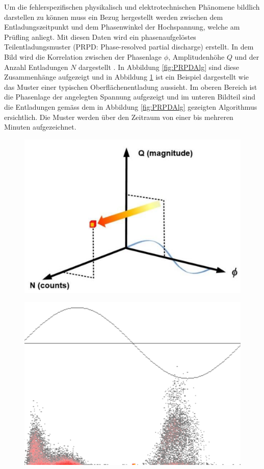 \begin{refsection}
Um die fehlerspezifischen physikalisch und elektrotechnischen Phänomene bildlich darstellen zu können muss ein Bezug hergestellt werden zwischen dem Entladungszeitpunkt und dem Phasenwinkel der Hochspannung, welche am Prüfling anliegt. 
Mit diesen Daten wird ein phasenaufgelöstes Teilentladungsmuster (PRPD: Phase-resolved partial discharge) erstellt. 
In dem Bild wird die Korrelation zwischen der Phasenlage $\phi$, Amplitudenhöhe $Q$ und der Anzahl Entladungen $N$ dargestellt \cite{buch:UHFSignale}. 
In Abbildung \ref{fig:PRPDAlg} sind diese Zusammenhänge aufgezeigt und in Abbildung \ref{fig:PRPDHohl} 
ist ein Beispiel dargestellt wie das Muster einer typischen Oberflächenentladung aussieht. 
Im oberen Bereich ist die Phasenlage der angelegten Spannung aufgezeigt und im unteren Bildteil sind die Entladungen gemäss dem in Abbildung \ref{fig:PRPDAlg} gezeigten Algorithmus ersichtlich.
Die Muster werden über den Zeitraum von einer bis mehreren Minuten aufgezeichnet.
\begin{figure}
	\centering
	\begin{minipage}{.5\textwidth}
		\centering
		\includegraphics[width=.9\linewidth]{papers/gis/Bilder/PERP}
		\label{fig:PRPDAlg}
	\end{minipage}%
	\begin{minipage}{.5\textwidth}
		\centering
		\includegraphics[width=.8\linewidth]{papers/gis/Bilder/OberflaechenentladungPRPD}
		\label{fig:PRPDHohl}
	\end{minipage}
\end{figure}



\end{refsection}
